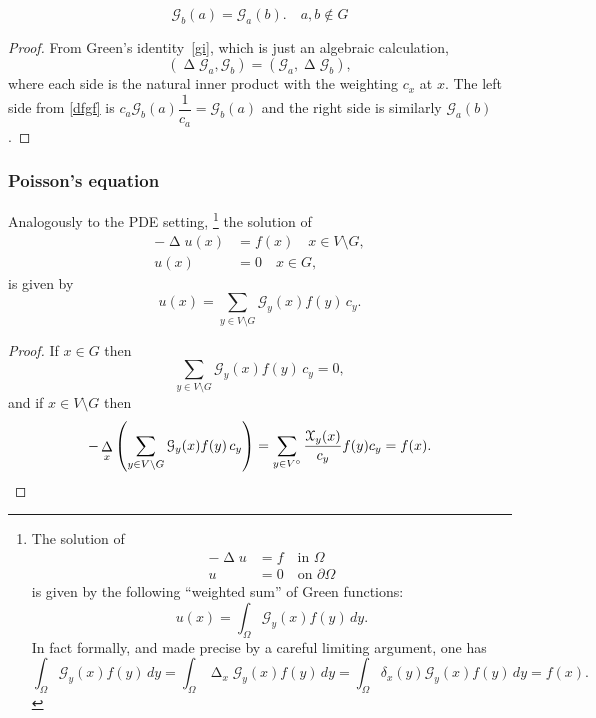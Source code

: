 \documentclass[a4paper]{amsart}
\theoremstyle{plain}
\theoremstyle{definition}
\theoremstyle{remark}
\DeclareMathOperator{\lap}{\Delta}
\begin{document}
\begin{equation} \label{} 
\boxed{\mathcal{G}_b(a) =  \mathcal{G}_a(b).} \quad a,b\notin G
\end{equation}
 
\begin{proof}
From Green's identity~\eqref{gi}, which is just an algebraic calculation,
\[  (\lap \mathcal{G}_a, \mathcal{G}_b) = (\mathcal{G}_a, \lap \mathcal{G}_b) ,\]
where each side is the natural inner product with the weighting $ c_x $ at $ x $.  The left side from \eqref{dfgf} is $ c_a \mathcal{G}_b(a) \dfrac{1}{c_a}  = \mathcal{G}_b(a) $ and the right side is similarly $ \mathcal{G}_a(b) $.
\end{proof} 




\subsubsection{Poisson's equation}  Analogously to the PDE setting,%
\footnote{
The solution of 
\begin{align*}
-\lap u & = f \quad \text{in } \Omega \\
 u &= 0 \quad \text{on } \partial \Omega
 \end{align*} 
 is given by the following ``weighted sum'' of Green functions:
 \[
 u(x) = \int_{\Omega} \mathcal{G}_y(x) f(y)\,  dy.
 \]
 In fact formally, and made precise by a careful limiting argument, one has
 \[
 \int_\Omega \mathcal{G}_y(x) f(y)\, dy 
 = \int_\Omega  \lap_x\mathcal{G}_y(x) f(y)\, dy
 =   \int_\Omega \delta_x(y) \mathcal{G}_y(x) f(y)\, dy = f(x).
 \]
 }
the solution of 
\begin{equation} \label{}
\begin{aligned}
- \lap u (x) &= f (x) \quad x \in V\setminus G, \\
u(x) &= 0 \quad x \in G,
\end{aligned}
\end{equation}
is given by 
\begin{equation} \label{}
\boxed{u(x) = \sum_{y\in V\setminus G} \mathcal{G}_y(x)  f(y)\, c_y.}
\end{equation}
\begin{proof} If $ x \in G $ then
\[
       \sum_{y\in V\setminus G} \mathcal{G}_y(x)  f(y)\, c_y = 0 ,
       \]
 and if $ x \in V \setminus G $ then
\[-\lap_x \left(  \sum_{y\in V\setminus G} \mathcal{G}_y(x)  f(y)\, c_y \right) =
       \sum_{y\in V^\circ} \frac{\mathcal{X}_y(x)}{c_y} f(y) c_y = f(x). \qedhere
       \]
\end{proof}        
\end{document}
